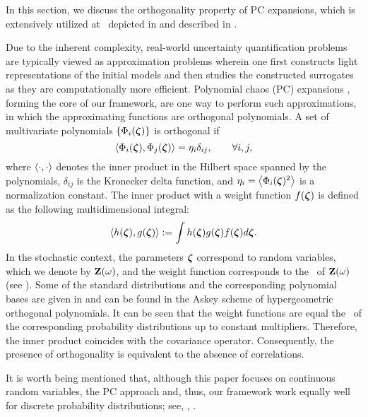 In this section, we discuss the orthogonality property \cite{xiu2010, maitre2010} of PC expansions, which is extensively utilized at \  depicted in  and described in .

Due to the inherent complexity, real-world uncertainty quantification problems are typically viewed as approximation problems wherein one first constructs light representations of the initial models and then studies the constructed surrogates as they are computationally more efficient.
Polynomial chaos (PC) expansions \cite{xiu2010}, forming the core of our framework, are one way to perform such approximations, in which the approximating functions are orthogonal polynomials.
A set of multivariate polynomials $\{ \Phi_i(\boldsymbol{\zeta}) \}$ is orthogonal if
\begin{equation} \elabel{orthogonality}
  \oInner{\pcb_i(\vz)}{\pcb_j(\vz)} = \pcn_i \delta_{ij}, \qquad \forall i, j,
\end{equation}
where $\oInner{\cdot}{\cdot}$ denotes the inner product in the Hilbert space spanned by the polynomials, $\delta_{ij}$ is the Kronecker delta function, and $\pcn_i = \oInner{\pcb_i(\vz)^2}$ is a normalization constant.
The inner product with a weight function $f(\boldsymbol{\zeta})$ is defined as the following multidimensional integral:
\begin{equation} \elabel{inner-product}
  \oInner{h(\vz)}{g(\vz)} := \int h(\vz) g(\vz) \fPDF(\vz) d\vz.
\end{equation}
In the stochastic context, the parameters $\boldsymbol{\zeta}$ correspond to random variables, which we denote by $\mathbf{Z}(\omega)$, and the weight function corresponds to the \pdf\ of $\mathbf{Z}(\omega)$ (see ).
Some of the standard distributions and the corresponding polynomial bases are given in  \cite{eldred2008} and can be found in the Askey scheme \cite{xiu2010} of hypergeometric orthogonal polynomials.
It can be seen that the weight functions are equal the \pdfs\ of the corresponding probability distributions up to constant multipliers.
Therefore, the inner product coincides with the covariance operator.
Consequently, the presence of orthogonality is equivalent to the absence of correlations.

It is worth being mentioned that, although this paper focuses on continuous random variables, the PC approach and, thus, our framework work equally well for discrete probability distributions; see, \eg, \cite{xiu2010, maitre2010}.
